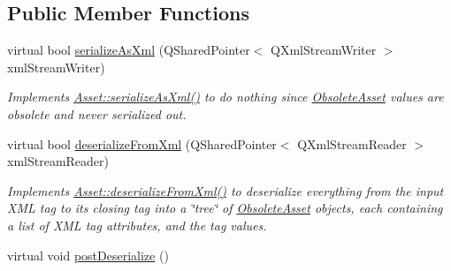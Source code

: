 \subsection*{Public Member Functions}
\begin{DoxyCompactItemize}
\item 
\hypertarget{class_picto_1_1_obsolete_asset_a0fa27acdc34bf7fdac3dedd6493733f8}{virtual bool \hyperlink{class_picto_1_1_obsolete_asset_a0fa27acdc34bf7fdac3dedd6493733f8}{serialize\-As\-Xml} (Q\-Shared\-Pointer$<$ Q\-Xml\-Stream\-Writer $>$ xml\-Stream\-Writer)}\label{class_picto_1_1_obsolete_asset_a0fa27acdc34bf7fdac3dedd6493733f8}

\begin{DoxyCompactList}\small\item\em Implements \hyperlink{class_picto_1_1_asset_a3ecc27a886c700438d98187e030d203f}{Asset\-::serialize\-As\-Xml()} to do nothing since \hyperlink{class_picto_1_1_obsolete_asset}{Obsolete\-Asset} values are obsolete and never serialized out. \end{DoxyCompactList}\item 
virtual bool \hyperlink{class_picto_1_1_obsolete_asset_a89766dd18a16e9368a4e737df8798310}{deserialize\-From\-Xml} (Q\-Shared\-Pointer$<$ Q\-Xml\-Stream\-Reader $>$ xml\-Stream\-Reader)
\begin{DoxyCompactList}\small\item\em Implements \hyperlink{class_picto_1_1_asset_a45e33e9da0d81734ec9e50a02ac325be}{Asset\-::deserialize\-From\-Xml()} to deserialize everything from the input X\-M\-L tag to its closing tag into a \char`\"{}tree\char`\"{} of \hyperlink{class_picto_1_1_obsolete_asset}{Obsolete\-Asset} objects, each containing a list of X\-M\-L tag attributes, and the tag values. \end{DoxyCompactList}\item 
\hypertarget{class_picto_1_1_obsolete_asset_a2317c155f6d4f933380955645bf22147}{virtual void \hyperlink{class_picto_1_1_obsolete_asset_a2317c155f6d4f933380955645bf22147}{post\-Deserialize} ()}\label{class_picto_1_1_obsolete_asset_a2317c155f6d4f933380955645bf22147}


\end{DoxyCompactItemize}
